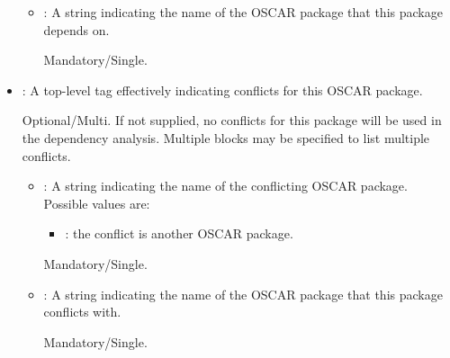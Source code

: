\begin{itemize}
\begin{itemize}
    
  \item {}: A string indicating the name of the OSCAR
    package that this package depends on.

    Mandatory/Single.
  \end{itemize}
    
\item {}: A top-level tag effectively indicating
  conflicts for this OSCAR package.
  
  Optional/Multi.  If not supplied, no conflicts for this package will
  be used in the dependency analysis.  Multiple 
  blocks may be specified to list multiple conflicts.

  \begin{itemize}
  \item {}: A string indicating the name of the conflicting
    OSCAR package.  Possible values are:

    \begin{itemize}
    \item {}: the conflict is another OSCAR package.
    \end{itemize}

    Mandatory/Single.
    

    
    
  \item {}: A string indicating the name of the OSCAR
    package that this package conflicts with.

    Mandatory/Single.
    

\end{itemize}
\end{itemize}
